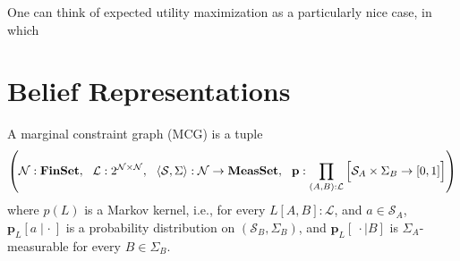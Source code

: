\documentclass{article}
\begin{document}
	One can think of expected utility maximization as a particularly nice case, in which 


	
%	
%	
%	
	
	




	
	\part{Belief Representations}
	
	\begin{defn}\label{def:mcg}
		A marginal constraint graph (MCG) is a tuple 
		\[ \left(\mathcal N : \mathbf{FinSet},~~\mathcal L : 2^{\cal N \times N},~~ \langle\mathcal S, \Sigma\rangle : \mathcal N \to \mathbf{MeasSet}, ~~\mathbf p : \prod_{(A,B): \mathcal L} \left[ \Big. \mathcal S_A \times \Sigma_B \to [0,1]\right] \right) \]
		where $p(L)$ is a Markov kernel, i.e., for every $L[A,B] : \mathcal L$, and $a \in \mathcal S_A$, $\mathbf p_L[a \mid \cdot~]$ is a probability distribution on $(\mathcal S_B, \Sigma_B)$, and $\mathbf p_L[~\cdot \mid B]$ is $\Sigma_A$-measurable for every $B \in \Sigma_B$.
	\end{defn}
\end{document}
